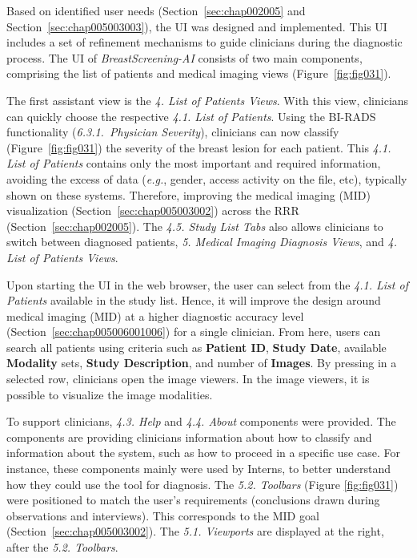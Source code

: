 Based on identified user needs (Section~\ref{sec:chap002005} and Section~\ref{sec:chap005003003}), the \ac{UI} was designed and implemented.
This \ac{UI} includes a set of refinement mechanisms to guide clinicians during the diagnostic process.
The \ac{UI} of {\it BreastScreening-AI} consists of two main components, comprising the list of patients and medical imaging views (Figure~\ref{fig:fig031}).

The first assistant view is the {\it 4. List of Patients Views}.
With this view, clinicians can quickly choose the respective {\it 4.1. List of Patients}.
Using the \ac{BI-RADS} functionality ({\it 6.3.1.~Physician Severity}), clinicians can now classify (Figure~\ref{fig:fig031}) the severity of the breast lesion for each patient.
This {\it 4.1. List of Patients} contains only the most important and required information, avoiding the excess of data ({\it e.g.}, gender, access activity on the file, etc), typically shown on these systems.
Therefore, improving the medical imaging (\ac{MID}) visualization (Section~\ref{sec:chap005003002}) across the \ac{RRR} (Section~\ref{sec:chap002005}).
The {\it 4.5. Study List Tabs} also allows clinicians to switch between diagnosed patients, {\it 5. Medical Imaging Diagnosis Views}, and {\it 4. List of Patients Views}.

Upon starting the \ac{UI} in the web browser, the user can select from the {\it 4.1. List of Patients} available in the study list.
Hence, it will improve the design around medical imaging (\ac{MID}) at a higher diagnostic accuracy level (Section~\ref{sec:chap005006001006}) for a single clinician.
From here, users can search all patients using criteria such as {\bf Patient ID}, {\bf Study Date}, available {\bf Modality} sets, {\bf Study Description}, and number of {\bf Images}.
By pressing in a selected row, clinicians open the image viewers.
In the image viewers, it is possible to visualize the image modalities.

To support clinicians, {\it 4.3. Help} and {\it 4.4. About} components were provided.
The components are providing clinicians information about how to classify and information about the system, such as how to proceed in a specific use case.
For instance, these components mainly were used by Interns, to better understand how they could use the tool for diagnosis.
The {\it 5.2. Toolbars} (Figure \ref{fig:fig031}) were positioned to match the user's requirements (conclusions drawn during observations and interviews).
This corresponds to the MID goal (Section~\ref{sec:chap005003002}).
The {\it 5.1. Viewports} are displayed at the right, after the {\it 5.2. Toolbars}.

